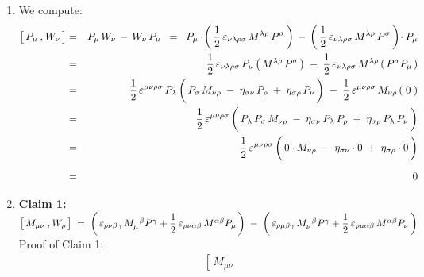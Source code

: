 \begin{enumerate}
\item
	We compute:
	\begin{eqnarray*}
	\left[\,
		P_{\mu}
		\,\overset{{\color{white}1}}{,}\,
		W_{\nu}
		\,\right]
	& = &
		P_{\mu}\,W_{\nu} \,-\, W_{\nu}\,P_{\mu}
	\;\; = \;\;
		P_{\mu}
		\cdot\!
		\left(\,\dfrac{1}{2}\,\varepsilon_{\nu\lambda\rho\sigma}\,M^{\lambda\rho}\,P^{\sigma}\,\right)
		\,-\,
		\left(\,\dfrac{1}{2}\,\varepsilon_{\nu\lambda\rho\sigma}\,M^{\lambda\rho}\,P^{\sigma}\,\right)
		\!\cdot
		P_{\mu}
	\\
	& = &
		\dfrac{1}{2}\,\varepsilon_{\nu\lambda\rho\sigma}\,P_{\mu}\left(\,M^{\lambda\rho}\,P^{\sigma}\,\right)
		\;-\;
		\dfrac{1}{2}\,\varepsilon_{\nu\lambda\rho\sigma}\,M^{\lambda\rho}\left(\,P^{\sigma}P_{\mu}\,\right)
	\\
	& = &
		\dfrac{1}{2}\,\varepsilon^{\mu\nu\rho\sigma}\,P_{\lambda}
		\left(\,
			P_{\sigma}\,M_{\nu\rho}
			\;\overset{{\color{white}1}}{-}\;
			\eta_{\sigma\nu}\,P_{\rho}
			\;+\;
			\eta_{\sigma\rho}\,P_{\nu}
			\,\right)
		\;-\;
		\dfrac{1}{2}\,\varepsilon^{\mu\nu\rho\sigma}\,M_{\nu\rho}\left(\;0\;\right)
	\\
	& = &
		\dfrac{1}{2}\,\varepsilon^{\mu\nu\rho\sigma} %
		\left(\,
			P_{\lambda}\,P_{\sigma}\,M_{\nu\rho}
			\;\overset{{\color{white}1}}{-}\;
			\eta_{\sigma\nu}\,P_{\lambda}\,P_{\rho}
			\;+\;
			\eta_{\sigma\rho}\,P_{\lambda}\,P_{\nu}
			\,\right)
	\\
	& = &
		\dfrac{1}{2}\,\varepsilon^{\mu\nu\rho\sigma}
		\left(\,
			0 \cdot M_{\nu\rho}
			\;\overset{{\color{white}1}}{-}\;
			\eta_{\sigma\nu} \cdot 0
			\;+\;
			\eta_{\sigma\rho} \cdot 0
			\,\right)
	\\
	& \overset{{\color{white}\textnormal{\large$1$}}}{=} &
		0
	\end{eqnarray*}
\item
	\noindent
	\textbf{Claim 1:}\quad
	$
	\left[\,
		M_{\mu\nu}
		\,\overset{{\color{white}1}}{,}\,
		W_{\rho}
		\,\right]
	\; = \;
		\left(\,
			\varepsilon_{\rho\nu\beta\gamma}\,
			M_{\mu}^{{\color{white}\mu}\beta}P^{\gamma}
			+
			\dfrac{1}{2}\,\varepsilon_{\rho\nu\alpha\beta}\,
			M^{\alpha\beta}P_{\mu}
			\,\right)
		\;-\;
		\left(\,
			\varepsilon_{\rho\mu\beta\gamma}\,
			M_{\nu}^{{\color{white}\nu}\beta}P^{\gamma}
			+
			\dfrac{1}{2}\,\varepsilon_{\rho\mu\alpha\beta}\,
			M^{\alpha\beta}P_{\nu}
			\,\right)
	$
	\vskip 0.1cm
	\noindent
	Proof of Claim 1:\;\;
	\begin{eqnarray*}
	&&
		\left[\,
			M_{\mu\nu}

\end{eqnarray*}
\end{enumerate}
